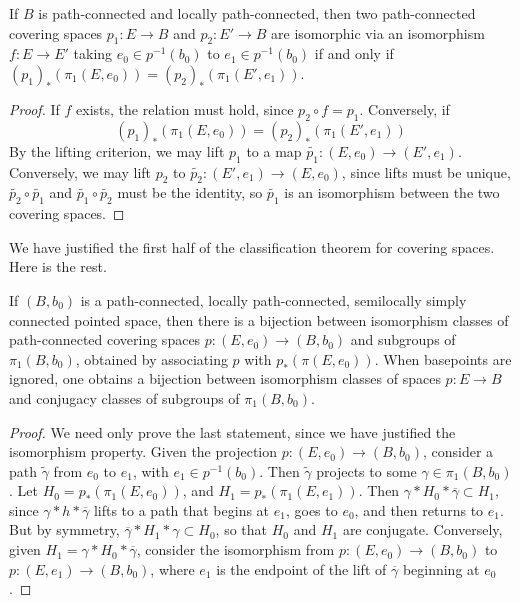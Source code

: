 \begin{theorem}
    If $B$ is path-connected and locally path-connected, then two path-connected covering spaces $p_1: E \to B$ and $p_2: E' \to B$ are isomorphic via an isomorphism $f: E \to E'$ taking $e_0 \in p^{-1}(b_0)$ to $e_1 \in p^{-1}(b_0)$ if and only if $(p_1)_*(\pi_1(E,e_0)) = (p_2)_*(\pi_1(E',e_1))$.
\end{theorem}
\begin{proof}
    If $f$ exists, the relation must hold, since $p_2 \circ f = p_1$. Conversely, if
    \[ (p_1)_*(\pi_1(E,e_0)) = (p_2)_*(\pi_1(E',e_1)) \]
    By the lifting criterion, we may lift $p_1$ to a map $\tilde{p_1}: (E,e_0) \to (E',e_1)$. Conversely, we may lift $p_2$ to $\tilde{p_2}: (E', e_1) \to (E,e_0)$, since lifts must be unique, $\tilde{p_2} \circ \tilde{p_1}$ and $\tilde{p_1} \circ \tilde{p_2}$ must be the identity, so $\tilde{p_1}$ is an isomorphism between the two covering spaces.
\end{proof}

We have justified the first half of the classification theorem for covering spaces. Here is the rest.

\begin{theorem}
    If $(B,b_0)$ is a path-connected, locally path-connected, semilocally simply connected pointed space, then there is a bijection between isomorphism classes of path-connected covering spaces $p: (E,e_0) \to (B,b_0)$ and subgroups of $\pi_1(B,b_0)$, obtained by associating $p$ with $p_*(\pi(E,e_0))$. When basepoints are ignored, one obtains a bijection between isomorphism classes of spaces $p: E \to B$ and conjugacy classes of subgroups of $\pi_1(B,b_0)$.
\end{theorem}
\begin{proof}
    We need only prove the last statement, since we have justified the isomorphism property. Given the projection $p: (E,e_0) \to (B,b_0)$, consider a path $\tilde{\gamma}$ from $e_0$ to $e_1$, with $e_1 \in p^{-1}(b_0)$. Then $\tilde{\gamma}$ projects to some $\gamma \in \pi_1(B,b_0)$. Let $H_0 = p_*(\pi_1(E,e_0))$, and $H_1 = p_*(\pi_1(E,e_1))$. Then $\gamma * H_0 * \overline{\gamma} \subset H_1$, since $\gamma * h * \overline{\gamma}$ lifts to a path that begins at $e_1$, goes to $e_0$, and then returns to $e_1$. But by symmetry, $\overline{\gamma} * H_1 * \gamma \subset H_0$, so that $H_0$ and $H_1$ are conjugate. Conversely, given $H_1 = \gamma * H_0 * \overline{\gamma}$, consider the isomorphism from $p: (E,e_0) \to (B,b_0)$ to $p: (E,e_1) \to (B,b_0)$, where $e_1$ is the endpoint of the lift of $\overline{\gamma}$ beginning at $e_0$.
\end{proof}

